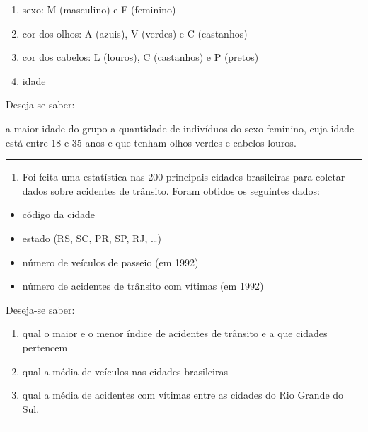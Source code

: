\documentclass[12pt,a4paper]{article}
\providecommand{\tightlist}{%
      \setlength{\itemsep}{0pt}\setlength{\parskip}{0pt}}
\begin{document}
\begin{enumerate}
\def\labelenumi{\alph{enumi})}
\item
  sexo: M (masculino) e F (feminino)
\item
  cor dos olhos: A (azuis), V (verdes) e C (castanhos)
\item
  cor dos cabelos: L (louros), C (castanhos) e P (pretos)
\item
  idade
\end{enumerate}

Deseja-se saber:

a maior idade do grupo a quantidade de indivíduos do sexo feminino, cuja
idade está entre 18 e 35 anos e que tenham olhos verdes e cabelos
louros.

    \begin{center}\rule{0.5\linewidth}{0.5pt}\end{center}

\begin{enumerate}
\def\labelenumi{\arabic{enumi}.}
\setcounter{enumi}{11}
\tightlist
\item
  Foi feita uma estatística nas 200 principais cidades brasileiras para
  coletar dados sobre acidentes de trânsito. Foram obtidos os seguintes
  dados:
\end{enumerate}

\begin{itemize}
\item
  código da cidade
\item
  estado (RS, SC, PR, SP, RJ, \ldots)
\item
  número de veículos de passeio (em 1992)
\item
  número de acidentes de trânsito com vítimas (em 1992)
\end{itemize}

Deseja-se saber:

\begin{enumerate}
\def\labelenumi{\alph{enumi})}
\item
  qual o maior e o menor índice de acidentes de trânsito e a que cidades
  pertencem
\item
  qual a média de veículos nas cidades brasileiras
\item
  qual a média de acidentes com vítimas entre as cidades do Rio Grande
  do Sul.
\end{enumerate}

    \begin{center}\rule{0.5\linewidth}{0.5pt}\end{center}
\end{document}
